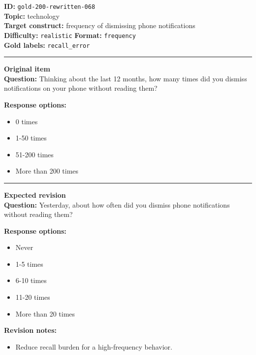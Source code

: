 \documentclass[10pt,a4paper]{article}
\newcommand{\sectionline}{\vspace{0.15em}\hrule\vspace{0.35em}}
\begin{document}
\begin{tcolorbox}[colframe=FlawRed,colback=white,colbacktitle=FlawRed!9,coltitle=black,title={Item 068\hfill Flawed item}]
\textbf{ID:} \texttt{gold-200-rewritten-068}\\
\textbf{Topic:} technology\\
\textbf{Target construct:} frequency of dismissing phone notifications\\
\textbf{Difficulty:} \texttt{realistic} \quad \textbf{Format:} \texttt{frequency}\\
\textbf{Gold labels:} \texttt{recall\_error}\\
\sectionline
\textbf{Original item}\\
\textbf{Question:} Thinking about the last 12 months, how many times did you dismiss notifications on your phone without reading them?
\par\textbf{Response options:}
\begin{itemize}
\item 0 times
\item 1-50 times
\item 51-200 times
\item More than 200 times
\end{itemize}
\sectionline
\textbf{Expected revision}\\
\textbf{Question:} Yesterday, about how often did you dismiss phone notifications without reading them?
\par\textbf{Response options:}
\begin{itemize}
\item Never
\item 1-5 times
\item 6-10 times
\item 11-20 times
\item More than 20 times
\end{itemize}
\par\textbf{Revision notes:}
\begin{itemize}
\item Reduce recall burden for a high-frequency behavior.
\end{itemize}
\end{tcolorbox}
\end{document}
